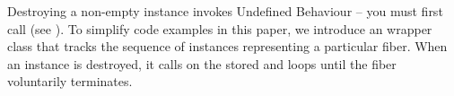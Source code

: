 \newpage
{}\label{launch}\label{appendixa}

Destroying a non-empty \fiber instance invokes Undefined Behaviour -- you must
first call \reqstop (see ). To simplify code examples in
this paper, we introduce an  wrapper class that tracks the
sequence of \fiber instances representing a particular fiber. When
an  instance is destroyed, it calls \reqstop on the
stored \fiber and loops until the fiber voluntarily terminates.

